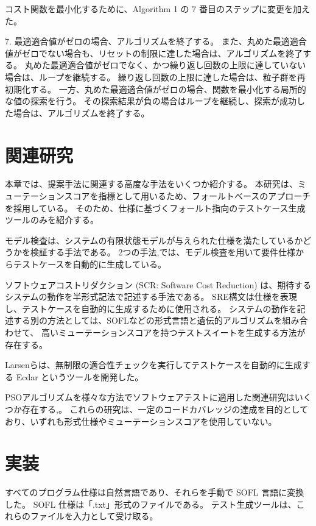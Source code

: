 \documentclass[uplatex, twocolumn, 10pt]{jsarticle} %
\begin{document}
コスト関数を最小化するために、Algorithm 1 の 7 番目のステップに変更を加えた。

7. 最適適合値がゼロの場合、アルゴリズムを終了する。
また、丸めた最適適合値がゼロでない場合も、リセットの制限に達した場合は、アルゴリズムを終了する。
丸めた最適適合値がゼロでなく、かつ繰り返し回数の上限に達していない場合は、ループを継続する。
繰り返し回数の上限に達した場合は、粒子群を再初期化する。
一方、丸めた最適適合値がゼロの場合、関数を最小化する局所的な値の探索を行う。
その探索結果が負の場合はループを継続し、探索が成功した場合は、アルゴリズムを終了する。

\section{関連研究}
\label{sec:related_work}
本章では、提案手法に関連する高度な手法をいくつか紹介する。
本研究は、ミューテーションスコアを指標として用いるため、フォールトベースのアプローチを採用している。
そのため、仕様に基づくフォールト指向のテストケース生成ツールのみを紹介する。

モデル検査は、システムの有限状態モデルが与えられた仕様を満たしているかどうかを検証する手法である。
2つの手法\cite{10},\cite{11}では、モデル検査を用いて要件仕様からテストケースを自動的に生成している。

ソフトウェアコストリダクション (SCR: Software Cost Reduction) は、期待するシステムの動作を半形式記法で記述する手法である。
SRE構文は仕様を表現し、テストケースを自動的に生成するために使用される\cite{12}。
システムの動作を記述する別の方法としては、SOFL\cite{14}などの形式言語と遺伝的アルゴリズムを組み合わせて、
高いミューテーションスコアを持つテストスイートを生成する方法が存在する。

Larsenら\cite{13}は、無制限の適合性チェックを実行してテストケースを自動的に生成する Ecdar というツールを開発した。

PSOアルゴリズムを様々な方法でソフトウェアテストに適用した関連研究はいくつか存在する\cite{15},\cite{2}。
これらの研究は、一定のコードカバレッジの達成を目的としており、いずれも形式仕様やミューテーションスコアを使用していない。

\section{実装}
\label{sec:implementation}
すべてのプログラム仕様は自然言語であり、それらを手動で SOFL 言語に変換した。
SOFL 仕様は「.txt」形式のファイルである。
テスト生成ツールは、これらのファイルを入力として受け取る。
\end{document}
